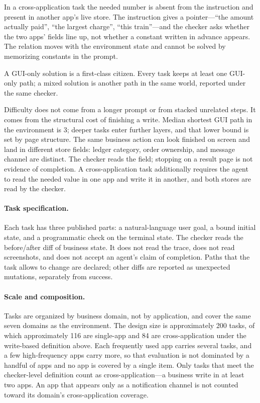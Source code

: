 In a cross-application task the needed number is absent from the instruction and present in another app's live store. The instruction gives a pointer---``the amount actually paid'', ``the largest charge'', ``this train''---and the checker asks whether the two apps' fields line up, not whether a constant written in advance appears. The relation moves with the environment state and cannot be solved by memorizing constants in the prompt.

A GUI-only solution is a first-class citizen. Every task keeps at least one GUI-only path; a mixed solution is another path in the same world, reported under the same checker.

Difficulty does not come from a longer prompt or from stacked unrelated steps. It comes from the structural cost of finishing a write. Median shortest GUI path in the environment is 3; deeper tasks enter further layers, and that lower bound is set by page structure. The same business action can look finished on screen and land in different store fields: ledger category, order ownership, and message channel are distinct. The checker reads the field; stopping on a result page is not evidence of completion. A cross-application task additionally requires the agent to read the needed value in one app and write it in another, and both stores are read by the checker.

\paragraph{Task specification.}
Each task has three published parts: a natural-language user goal, a bound initial state, and a programmatic check on the terminal state. The checker reads the before/after diff of business state. It does not read the trace, does not read screenshots, and does not accept an agent's claim of completion. Paths that the task allows to change are declared; other diffs are reported as unexpected mutations, separately from success.

\paragraph{Scale and composition.}
Tasks are organized by business domain, not by application, and cover the same seven domains as the environment. The design size is approximately 200 tasks, of which approximately 116 are single-app and 84 are cross-application under the write-based definition above. Each frequently used app carries several tasks, and a few high-frequency apps carry more, so that evaluation is not dominated by a handful of apps and no app is covered by a single item. Only tasks that meet the checker-level definition count as cross-application---a business write in at least two apps. An app that appears only as a notification channel is not counted toward its domain's cross-application coverage.

